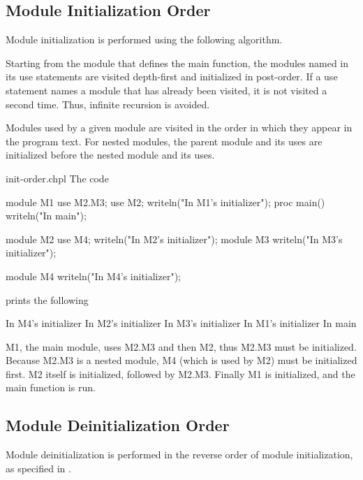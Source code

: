 \subsection{Module Initialization Order}
\label{Module_Initialization_Order}

Module initialization is performed using the following algorithm.

Starting from the module that defines the main function, the modules named in
its use statements are visited depth-first and initialized in post-order.  If a
use statement names a module that has already been visited, it is not visited a
second time.  Thus, infinite recursion is avoided.

Modules used by a given module are visited in the order in which
they appear in the program text.  For nested modules, the
parent module and its uses are initialized before the nested module and its uses.

\begin{chapelexample}{init-order.chpl}
The code
\begin{chapel}
module M1 {
  use M2.M3;
  use M2;
  writeln("In M1's initializer");
  proc main() {
    writeln("In main");
  }
}

module M2 {
  use M4;
  writeln("In M2's initializer");
  module M3 {
    writeln("In M3's initializer");
  }
}

module M4 {
  writeln("In M4's initializer");
}
\end{chapel}
prints the following
\begin{chapelprintoutput}{}
In M4's initializer
In M2's initializer
In M3's initializer
In M1's initializer
In main
\end{chapelprintoutput}
M1, the main module, uses M2.M3 and then M2, thus M2.M3 must be
initialized.  Because M2.M3 is a nested module, M4 (which is used by
M2) must be initialized first.  M2 itself is initialized, followed by
M2.M3.  Finally M1 is initialized, and the main function is run.
\end{chapelexample}


\subsection{Module Deinitialization Order}
\label{Module_Deinitialization_Order}

Module deinitialization is performed in the reverse order of
module initialization, as specified in
.

